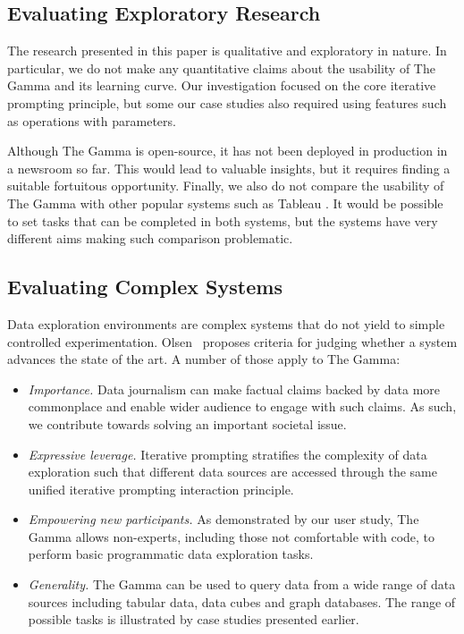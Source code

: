 \documentclass[manuscript,review,anonymous]{acmart}
\begin{document}
\subsection{Evaluating Exploratory Research}
The research presented in this paper is qualitative and exploratory in nature. In particular,
we do not make any quantitative claims about the usability of The Gamma and its learning curve.
Our investigation focused on the core iterative prompting principle, but some our case studies
also required using features such as operations with parameters.

Although The Gamma is open-source, it has not been deployed in production in a newsroom so far.
This would lead to valuable insights, but it requires finding a suitable fortuitous opportunity.
Finally, we also do not compare the usability of The Gamma with other popular systems
such as Tableau \cite{tableau}. It would be possible to set tasks that can be completed
in both systems, but the systems have very different aims making such comparison problematic.

\subsection{Evaluating Complex Systems}
Data exploration environments are complex systems that do not yield to simple controlled
experimentation. Olsen~\cite{evaluating} proposes criteria for judging whether a system advances
the state of the art. A number of those apply to The Gamma:

\begin{itemize}
\item \emph{Importance.} Data journalism can make factual claims backed by data more commonplace
and enable wider audience to engage with such claims. As such, we contribute towards
solving an important societal issue.

\item \emph{Expressive leverage.} Iterative prompting stratifies the complexity of data exploration
such that different data sources are accessed through the same unified iterative prompting
interaction principle.

\item \emph{Empowering new participants.} As demonstrated by our user study, The Gamma allows
non-experts, including those not comfortable with code, to perform basic programmatic
data exploration tasks.

\item \emph{Generality.} The Gamma can be used to query data from a wide range of data
sources including tabular data, data cubes and graph databases. The range of possible tasks is
illustrated by case studies presented earlier.
\end{itemize}
\end{document}
